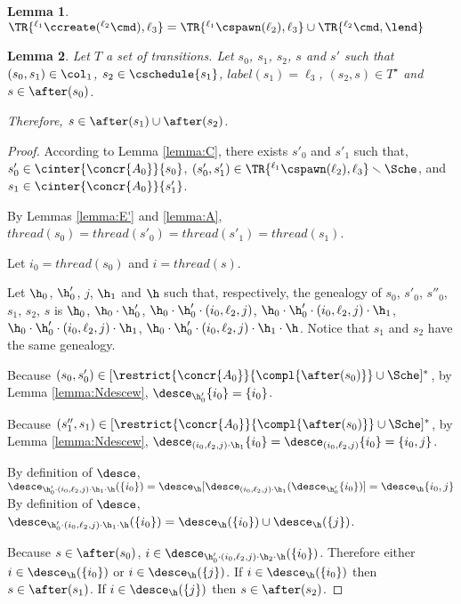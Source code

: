\documentclass[12pt]{article}
\let\firstunion\cup
\let\cup\firstunion
\newcommand{\li}[1]{ {}^{\ell_{#1}}  }
\newcommand{\lbl}{\mathit{label}}
\newcommand{\thread}{\mathit{thread}}
\newtheorem{lemma}{Lemma}
\begin{document}
\begin{lemma}\label{lemma:Gcr}
 \(\TR{\li1\ccreate(\li2\cmd),\ell_3} = \TR{\li1\cspawn(\ell_2),\ell_3}\cup\TR{\li2\cmd,\lend}\)
\end{lemma}

\begin{lemma}\label{lemma:apresC0}
Let \(T\) a set of transitions.
 Let \(s_0\), \(s_1\), \(s_2\), \(s\) and \(s'\) such that \((s_0,s_1)\in\col_1\), \(s_2\in\cschedule\{s_1\}\), \(\lbl(s_1)=\ell_3\), \((s_2,s)\in T^{\star}\) and \(s\in\after(s_0)\).
 
 Therefore, \(s\in\after(s_1) \cup \after(s_2)\).
\end{lemma}
\begin{proof}
According to Lemma \ref{lemma:C}, there exists \(s'_0\) and \(s'_1\) such that, \(s'_0\in\cinter{\concr{A_0}}\{s_0\}\), \((s'_0,s'_1)\in \TR{\li1\cspawn(\ell_2),\ell_3}\smallsetminus\Sche\), and  \(s_1\in\cinter{\concr{A_0}}\{s'_1\}\).

By Lemmas \ref{lemma:E'} and \ref{lemma:A}, \(\thread(s_0)=\thread(s'_0)=\thread(s'_1)=\thread(s_1)\).

Let \(i_0=\thread(s_0)\) and \(i=\thread(s)\).

Let \(\h_0\), \(\h'_0\), \(j\), \(\h_1\) and \(\h\) such that, respectively, the genealogy of 
\(s_0\), \(s'_0\), \(s''_0\), \(s_1\), \(s_2\), \(s\) is \(\h_0\), \(\h_0\cdot\h'_0\), \(\h_0\cdot\h'_0\cdot(i_0,\ell_2,j)\), \(\h_0\cdot\h'_0\cdot(i_0,\ell_2,j)\cdot\h_1\), \(\h_0\cdot\h'_0\cdot(i_0,\ell_2,j)\cdot\h_1\),  \(\h_0\cdot\h'_0\cdot(i_0,\ell_2,j)\cdot\h_1\cdot\h\).
Notice that \(s_1\) and \(s_2\) have the same genealogy. 


Because \((s_0,s'_{0})\in [\restrict{\concr{A_0}}{\compl{\after(s_0)}} \cup\Sche]^{\ast}\), by Lemma \ref{lemma:Ndescew}, \(\desce_{\h'_0}\{i_0\}= \{i_0\}\).

 Because \((s''_1,s_1)\in [\restrict{\concr{A_0}}{\compl{\after(s_0)}} \cup\Sche]^{\ast}\), by Lemma \ref{lemma:Ndescew}, \(\desce_{(i_0,\ell_2,j)\cdot\h_1}\{i_0\}= \desce_{(i_0,\ell_2,j)}\{i_0\}=\{i_0,j\}\).
 
 By definition of \(\desce\), \(\desce_{\h'_0\cdot(i_0,\ell_2,j)\cdot\h_1\cdot\h}(\{i_0\}) = \desce_{\h}[\desce_{(i_0,\ell_2,j)\cdot\h_1}(\desce_{\h'_0}\{i_0\})]=\desce_{\h}\{i_0,j\}\)
 By definition of \(\desce\), \(\desce_{\h'_0\cdot(i_0,\ell_2,j)\cdot\h_1\cdot\h}(\{i_0\}) = \desce_{\h}(\{i_0\})\cup\desce_{\h}(\{j\})\).
  
 Because \(s\in\after(s_0)\), \(i\in\desce_{\h'_0\cdot(i_0,\ell_2,j)\cdot\h_2\cdot\h}(\{i_0\})\). Therefore either \(i\in\desce_{\h}(\{i_0\}) \) or \(i\in\desce_{\h}(\{j\}) \).
 If \(i\in\desce_{\h}(\{i_0\}) \) then \(s\in\after(s_1)\).
 If \(i\in\desce_{\h}(\{j\}) \) then \(s\in\after(s_2)\).
\end{proof}
\end{document}
